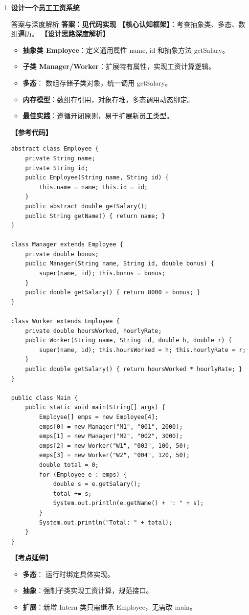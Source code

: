 ﻿\documentclass[12pt, a4paper]{ctexart}
\newcommand{\code}[1]{\texttt{\color{myblue}\detokenize{#1}}}
\begin{document}
\begin{enumerate}[label=\arabic*.]
	\item \textbf{设计一个员工工资系统}
	      \begin{bluebox}{答案与深度解析}
		      \textbf{答案：见代码实现}
		      \textbf{【核心认知框架】}：考查抽象类、多态、数组遍历。
		      \textbf{【设计思路深度解析】}
		      \begin{itemize}[leftmargin=*, nosep]
			      \item \textbf{抽象类 Employee}：定义通用属性 name, id 和抽象方法 getSalary。
			      \item \textbf{子类 Manager/Worker}：扩展特有属性，实现工资计算逻辑。
			      \item \textbf{多态}：\code{Employee[]} 数组存储子类对象，统一调用 getSalary。
			      \item \textbf{内存模型}：数组存引用，对象存堆，多态调用动态绑定。
			      \item \textbf{最佳实践}：遵循开闭原则，易于扩展新员工类型。
		      \end{itemize}
		      \textbf{【参考代码】}
		      \begin{lstlisting}
abstract class Employee {
    private String name;
    private String id;
    public Employee(String name, String id) {
        this.name = name; this.id = id;
    }
    public abstract double getSalary();
    public String getName() { return name; }
}

class Manager extends Employee {
    private double bonus;
    public Manager(String name, String id, double bonus) {
        super(name, id); this.bonus = bonus;
    }
    public double getSalary() { return 8000 + bonus; }
}

class Worker extends Employee {
    private double hoursWorked, hourlyRate;
    public Worker(String name, String id, double h, double r) {
        super(name, id); this.hoursWorked = h; this.hourlyRate = r;
    }
    public double getSalary() { return hoursWorked * hourlyRate; }
}

public class Main {
    public static void main(String[] args) {
        Employee[] emps = new Employee[4];
        emps[0] = new Manager("M1", "001", 2000);
        emps[1] = new Manager("M2", "002", 3000);
        emps[2] = new Worker("W1", "003", 100, 50);
        emps[3] = new Worker("W2", "004", 120, 50);
        double total = 0;
        for (Employee e : emps) {
            double s = e.getSalary();
            total += s;
            System.out.println(e.getName() + ": " + s);
        }
        System.out.println("Total: " + total);
    }
}
\end{lstlisting}
		      \textbf{【考点延伸】}
		      \begin{itemize}[leftmargin=*, nosep]
			      \item \textbf{多态}：\code{e.getSalary()} 运行时绑定具体实现。
			      \item \textbf{抽象}：强制子类实现工资计算，规范接口。
			      \item \textbf{扩展}：新增 Intern 类只需继承 Employee，无需改 main。
		      \end{itemize}
	      \end{bluebox}


\end{enumerate}
\end{document}
